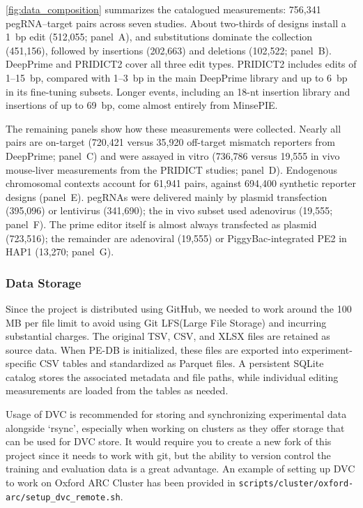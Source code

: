 \documentclass{article}
\begin{document}
\autoref{fig:data_composition} summarizes the catalogued measurements: 756,341 pegRNA--target pairs across seven studies. About two-thirds of designs install a 1~bp edit (512,055; panel~A), and substitutions dominate the collection (451,156), followed by insertions (202,663) and deletions (102,522; panel~B). DeepPrime and PRIDICT2 cover all three edit types. PRIDICT2 includes edits of 1--15~bp, compared with 1--3~bp in the main DeepPrime library and up to 6~bp in its fine-tuning subsets. Longer events, including an 18-nt insertion library and insertions of up to 69~bp, come almost entirely from MinsePIE.

The remaining panels show how these measurements were collected. Nearly all pairs are on-target (720,421 versus 35,920 off-target mismatch reporters from DeepPrime; panel~C) and were assayed in vitro (736,786 versus 19,555 in vivo mouse-liver measurements from the PRIDICT studies; panel~D). Endogenous chromosomal contexts account for 61,941 pairs, against 694,400 synthetic reporter designs (panel~E). pegRNAs were delivered mainly by plasmid transfection (395,096) or lentivirus (341,690); the in vivo subset used adenovirus (19,555; panel~F). The prime editor itself is almost always transfected as plasmid (723,516); the remainder are adenoviral (19,555) or PiggyBac-integrated PE2 in HAP1 (13,270; panel~G).


\subsubsection{Data Storage}

Since the project is distributed using GitHub, we needed to work around the 100 MB per file limit to avoid using Git LFS(Large File Storage) and incurring substantial charges.
The original TSV, CSV, and XLSX files are retained as source data. When PE-DB is initialized, these files are exported into experiment-specific CSV tables and standardized as Parquet files. A persistent SQLite catalog stores the associated metadata and file paths, while individual editing measurements are loaded from the tables as needed.

Usage of DVC is recommended for storing and synchronizing experimental data alongside `rsync', especially when working on clusters as they offer storage that can be used for DVC store. It would require you to create a new fork of this project since it needs to work with git, but the ability to version control the training and evaluation data is a great advantage. An example of setting up DVC to work on Oxford ARC Cluster has been provided in \nolinkurl{scripts/cluster/oxford-arc/setup_dvc_remote.sh}.
\end{document}

